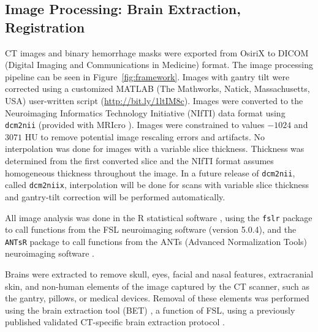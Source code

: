\documentclass{elsarticle_nonatbib}\usepackage[]{graphicx}\usepackage[]{color}
\newcommand{\pkg}[1]{\texttt{#1}}
\newcommand{\code}[1]{\texttt{#1}}
\begin{document}
\subsection{Image Processing: Brain Extraction, Registration}
CT images and binary hemorrhage masks were exported from OsiriX to DICOM (Digital Imaging and Communications in Medicine) format.   The image processing pipeline can be seen in Figure~\ref{fig:framework}.   Images with gantry tilt were corrected using a customized MATLAB (The Mathworks, Natick, Massachusetts, USA) user-written script ({\scriptsize \url{http://bit.ly/1ltIM8c}}). Images were converted to the Neuroimaging Informatics Technology Initiative (NIfTI) data format using \code{dcm2nii} (provided with MRIcro \citep{rorden_stereotaxic_2000}).  Images were constrained to values $-1024$ and $3071$ HU to remove potential image rescaling errors and artifacts.   No interpolation was done for images with a variable slice thickness. Thickness was determined from the first converted slice and the NIfTI format assumes homogeneous thickness throughout the image.  In a future release of \code{dcm2nii}, called \code{dcm2niix}, interpolation will be done for scans with variable slice thickness and gantry-tilt correction will be performed automatically.

All image analysis was done in the R statistical software \citep{RCORE}, using the \pkg{fslr} \citep{muschelli2015fslr} package to call functions from the FSL \citep{jenkinson_fsl_2012} neuroimaging software (version 5.0.4), and the \pkg{ANTsR} package to call functions from the ANTs (Advanced Normalization Tools) neuroimaging software \citep{avants_reproducible_2011}.

Brains were extracted to remove skull, eyes, facial and nasal features, extracranial skin, and non-human elements of the image captured by the CT scanner, such as the gantry, pillows, or medical devices.  Removal of these elements was performed using the brain extraction tool (BET) \citep{smith_fast_2002}, a function of FSL, using a previously published validated CT-specific brain extraction protocol \citep{muschelli_validated_2015}.
\end{document}
